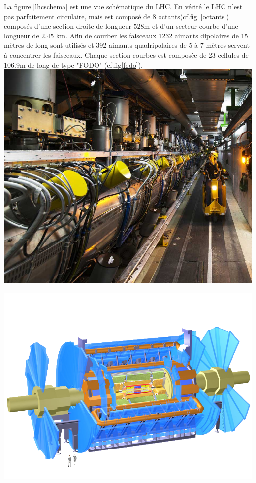 La figure \ref{lhcschema} est une vue schématique du LHC. En vérité le LHC n'est pas parfaitement circulaire, mais est composé de $8$ octants(cf.fig~\ref{octants}) composés d'une section droite de longueur $528$m et d'un secteur courbe d'une longueur de $2.45$ km. Afin de courber les faisceaux 1232 aimants dipolaires de 15 mètres de long sont utilisés et 392 aimants quadripolaires de 5 à 7 mètres servent à concentrer les faisceaux. Chaque section courbes est composée de 23 cellules de 106.9m de long de type "FODO" (cf.fig\ref{fodo}).
\marginpar
{
	\includegraphics[width=\marginparwidth]{LHC/RF.jpg}
	\label{radio}
}

\marginpar
{
	\includegraphics[width=\marginparwidth]{LHC/atlas.png}
	\label{atlas}
}

